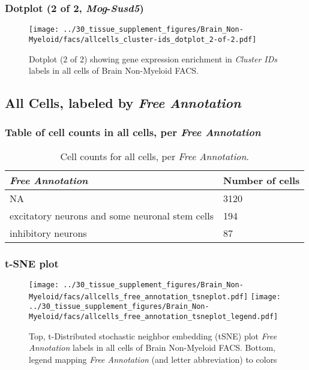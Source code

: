 \clearpage

\subsubsection{Dotplot (2 of 2, \emph{Mog}-\emph{Susd5})}
\begin{figure}[h]
\centering
\texttt{[image: ../30\_tissue\_supplement\_figures/Brain\_Non-Myeloid/facs/allcells\_cluster-ids\_dotplot\_2-of-2.pdf]}

\caption{ Dotplot (2 of 2)  showing gene expression enrichment in \emph{Cluster IDs} labels in all cells of Brain Non-Myeloid FACS. }
\end{figure}


\clearpage

\subsection{All Cells, labeled by \emph{Free Annotation}}
\subsubsection{Table of cell counts in all cells, per \emph{Free Annotation}}\begin{table}[h]
\centering
\label{my-label}
\begin{tabular}{@{}ll@{}}
\toprule

\emph{Free Annotation}& Number of cells \\ \midrule
NA & 3120 \\

excitatory neurons and some neuronal stem cells & 194 \\

inhibitory neurons & 87 \\
\bottomrule
\end{tabular}
\caption{Cell counts for all cells, per \emph{Free Annotation}.}
\end{table}

\clearpage
\subsubsection{t-SNE plot}
\begin{figure}[h]
\centering
\texttt{[image: ../30\_tissue\_supplement\_figures/Brain\_Non-Myeloid/facs/allcells\_free\_annotation\_tsneplot.pdf]}
\texttt{[image: ../30\_tissue\_supplement\_figures/Brain\_Non-Myeloid/facs/allcells\_free\_annotation\_tsneplot\_legend.pdf]}
\caption{Top, t-Distributed stochastic neighbor embedding (tSNE) plot  \emph{Free Annotation} labels in all cells of Brain Non-Myeloid FACS. Bottom, legend mapping \emph{Free Annotation} (and letter abbreviation) to colors}
\end{figure}


